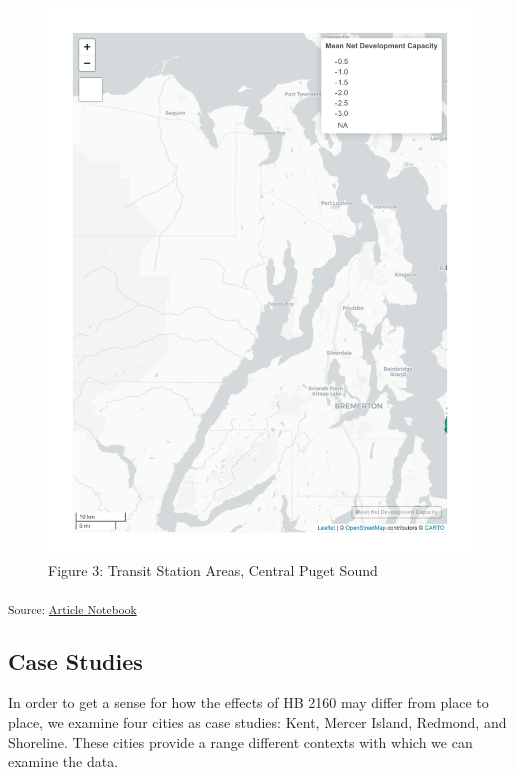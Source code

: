\documentclass[
]{agujournal2019}
\begin{document}
\begin{figure}[H]

{\centering \includegraphics{index_files/figure-pdf/results-puget-sound-station-map-1.pdf}

}

\caption{Figure 3: Transit Station Areas, Central Puget Sound}

\end{figure}%

\textsubscript{Source:
\href{https://tiernanmartin.github.io/2024-transit-oriented-development-bill/index.qmd.html}{Article
Notebook}}

\subsection{Case Studies}\label{case-studies}

In order to get a sense for how the effects of HB 2160 may differ from
place to place, we examine four cities as case studies: Kent, Mercer
Island, Redmond, and Shoreline. These cities provide a range different
contexts with which we can examine the data.
\end{document}
